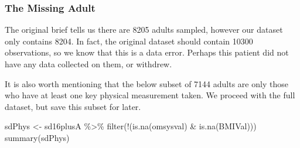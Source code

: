 \documentclass[
  11pt,
]{article}
\newenvironment{Shaded}{\begin{snugshade}}{\end{snugshade}}
\newcommand{\FunctionTok}[1]{\textcolor[rgb]{0.00,0.00,0.00}{#1}}
\newcommand{\NormalTok}[1]{#1}
\newcommand{\OtherTok}[1]{\textcolor[rgb]{0.56,0.35,0.01}{#1}}
\newcommand{\SpecialCharTok}[1]{\textcolor[rgb]{0.00,0.00,0.00}{#1}}
\begin{document}
\hypertarget{the-missing-adult}{%
\subsubsection{The Missing Adult}\label{the-missing-adult}}

The original brief tells us there are 8205 adults sampled, however our
dataset only contains 8204. In fact, the original dataset should contain
10300 observations, so we know that this is a data error. Perhaps this
patient did not have any data collected on them, or withdrew.

It is also worth mentioning that the below subset of 7144 adults are
only those who have at least one key physical measurement taken. We
proceed with the full dataset, but save this subset for later.

\begin{Shaded}
\begin{Highlighting}[]
\NormalTok{sdPhys }\OtherTok{\textless{}{-}}\NormalTok{ sd16plusA }\SpecialCharTok{\%\textgreater{}\%}
  \FunctionTok{filter}\NormalTok{(}\SpecialCharTok{!}\NormalTok{(}\FunctionTok{is.na}\NormalTok{(omsysval) }\SpecialCharTok{\&} \FunctionTok{is.na}\NormalTok{(BMIVal)))}
\FunctionTok{summary}\NormalTok{(sdPhys)}
\end{Highlighting}
\end{Shaded}
\end{document}
